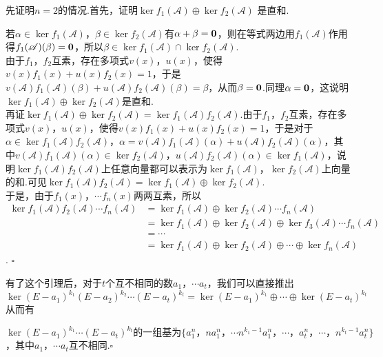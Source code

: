 \documentclass[10pt]{article}
\newcommand*{\QEDB}{\hfill\ensuremath{\square}}  %
\newcommand*{\D}{\text{，}}
\numberwithin{equation}{section}
\begin{document}
\begin{ZM}
    先证明$n=2$的情况.首先，证明$\ker f_1({\mathscr{A}}) \oplus \ker f_2({\mathscr{A}})$ 是直和.
    \par 若${\alpha} \in \ker f_1({\mathscr{A}})\D \beta \in \ker f_2({\mathscr{A}})$有$\alpha + \beta = {\bf{0}}$，则在等式两边用$f_1({\mathscr{A}})$作用得$f_1({\mathscr{A}})(\beta) = \bf{0}$，所以$\beta \in \ker f_1({\mathscr{A}}) \cap \ker f_2({\mathscr{A}})$. \\
    \indent 由于$f_1\D f_2$互素，存在多项式$v(x)\D u(x)$，使得$v(x)f_1(x)+u(x)f_2(x)=1$，于是$v({\mathscr{A}})f_1({\mathscr{A}})(\beta)+u({\mathscr{A}})f_2({\mathscr{A}})(\beta)=\beta$，从而$\beta = \bf{0}$.同理$\alpha = \bf{0}$，这说明$\ker f_1({\mathscr{A}}) \oplus \ker f_2({\mathscr{A}})$是直和. \\
    \indent 再证$\ker f_1({\mathscr{A}}) \oplus \ker f_2({\mathscr{A}}) = \ker f_1({\mathscr{A}})f_2({\mathscr{A}})$.由于$f_1\D f_2$互素，存在多项式$v(x)\D u(x)$，使得$v(x)f_1(x)+u(x)f_2(x)=1$，于是对于$\alpha \in \ker f_1({\mathscr{A}})f_2({\mathscr{A}})$，$\alpha = v({\mathscr{A}})f_1({\mathscr{A}})(\alpha)+u({\mathscr{A}})f_2({\mathscr{A}})(\alpha)$，其中$v({\mathscr{A}})f_1({\mathscr{A}})(\alpha) \in \ker f_2({\mathscr{A}})\D u({\mathscr{A}})f_2({\mathscr{A}})(\alpha) \in \ker f_1({\mathscr{A}})$，说明$\ker f_1({\mathscr{A}})f_2({\mathscr{A}})$上任意向量都可以表示为$\ker f_1({\mathscr{A}})$，$\ker f_2({\mathscr{A}})$上向量的和.可见$\ker f_1({\mathscr{A}})f_2({\mathscr{A}}) = \ker f_1({\mathscr{A}}) \oplus \ker f_2({\mathscr{A}})$. \\
    \indent 于是，由于$f_1(x)\D \cdots f_n(x)$两两互素，所以
    \[\begin{split}
        \ker f_1({\mathscr{A}})f_2({\mathscr{A}})\cdots f_n({\mathscr{A}}) &= \ker f_1({\mathscr{A}}) \oplus \ker f_2({\mathscr{A}})\cdots f_n({\mathscr{A}})\\ 
        &= \ker f_1({\mathscr{A}}) \oplus \ker f_2({\mathscr{A}}) \oplus \ker f_3({\mathscr{A}})\cdots f_n({\mathscr{A}}) \\ 
        &= \cdots\\
        &= \ker f_1({\mathscr{A}}) \oplus \ker f_2({\mathscr{A}}) \oplus \cdots \oplus \ker f_n({\mathscr{A}})
    \end{split}\]. \QEDB
\end{ZM}
\par 有了这个引理后，对于$t$个互不相同的数$a_1\D \cdots a_t$，我们可以直接推出
\[
    \ker(E-a_1)^{k_1}(E-a_2)^{k_2}\cdots (E-a_t)^{k_t} = \ker(E-a_1)^{k_1} \oplus \cdots \oplus \ker(E-a_t)^{k_t}
\]
从而有
\begin{TL}
    $\ker(E-a_1)^{k_1}\cdots (E-a_t)^{k_t} \text{的一组基为} \{a_1^n\D na_1^n \D \cdots n^{k_1-1}a_1^n \D \cdots \D a_{t}^n \D \cdots \D n^{k_t-1}a_{t}^n\}$，其中$a_1\D \cdots a_t$互不相同.\QEDB
\end{TL}
\end{document}
